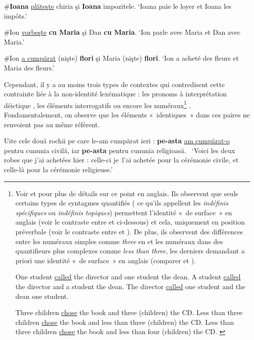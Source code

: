 \ea \label{ch2:ex152}
\ea \#\textbf{Ioana} \uline{plăteşte} chiria şi \textbf{Ioana} impozitele.
\glt ‘Ioana paie le loyer et Ioana les impôts.’  

\ex \#Ion \uline{vorbeşte} \textbf{cu Maria} şi Dan \textbf{cu Maria}. 
\glt ‘Ion parle avec Maria et Dan avec Maria.’

\ex \#Ion \uline{a cumpărat} (nişte) \textbf{flori} şi Maria (nişte) \textbf{flori}. 
\glt ‘Ion a acheté des fleurs et Maria des fleurs.’   
\z
\z

Cependant, il y a au moins trois types de contextes qui contredisent cette contrainte liée à la non-identité lexématique : les pronoms à interprétation déictique , les éléments interrogatifs  ou encore les numéraux\footnote{Voir \citet{HinterwimmerEtAl2008} et \citet{Repp2009} pour plus de détails sur ce point en anglais. Ils observent que seuls certains types de syntagmes quantifiés ({\cad} ce qu’ils appellent les \textit{indéfinis} \textit{spécifiques} ou \textit{indéfinis} \textit{topiques}) permettent l’identité «~de surface~» en anglais (voir le contraste entre  et  ci-dessous) et cela, uniquement en position préverbale (voir le contraste entre  et ). De plus, ils observent des différences entre les numéraux simples comme \textit{three} en  et les numéraux dans des quantifieurs plus complexes comme \textit{less than three}, les derniers demandant a priori une identité «~de surface~» en anglais (comparer  et ).
 
\ea
\ea One student \uline{called} the director and one student the dean. \label{ch2:foot49ia} 
\ex *A student \uline{called} the director and a student the dean. \label{ch2:foot49ib}
\ex *The director \uline{called} one student and the dean one student. \citep[9]{Repp2009} \label{ch2:foot49ic} 
\z\z

\ea
\ea Three children \uline{chose} the book and three (children) the CD. \label{ch2:foot49iia} 
\ex *Less than three children \uline{chose} the book and less than three (children) the CD. \label{ch2:foot49iib}
\ex Less than three children \uline{chose} the book and less than four (children) the CD. \citep[244]{HinterwimmerEtAl2008} \label{ch2:foot49iic} 
\z\z
} . Fondamentalement, on observe que les éléments «~identiques~» dans ces paires ne renvoient pas au même référent.


\ea \label{ch2:ex153}
\ea Uite cele două rochii pe care le-am cumpărat ieri : \textbf{pe-asta} \uline{am cumpărat-o} pentru cununia civilă, iar \textbf{pe-asta} pentru cununia religioasă.~ 
\glt ‘Voici les deux robes que j’ai achetées hier : celle-ci je~l’ai achetée pour la cérémonie civile, et celle-là pour la cérémonie religieuse.’   


